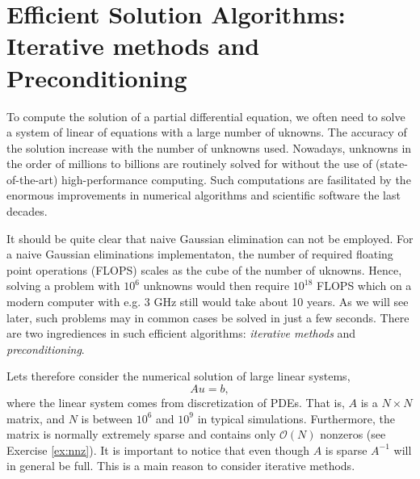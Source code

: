 \chapter{Efficient Solution Algorithms: Iterative methods and Preconditioning}

To compute the solution of a partial differential equation, we often 
need to solve a system of linear of equations with a large number of
uknowns. The accuracy of the solution increase with 
the number of unknowns used. Nowadays,  unknowns in the order
of millions to billions are routinely solved for  without the use of (state-of-the-art) 
high-performance computing. Such computations
are fasilitated by the enormous improvements in numerical algorithms and
scientific software the last decades.        

It should be quite clear that naive Gaussian elimination can not be employed. 
For a  naive Gaussian eliminations implementaton,   
the number of required floating point operations (FLOPS) scales as the cube
of the number of uknowns. Hence, solving a problem with $10^6$ unknowns
would then require $10^{18}$ FLOPS which on a modern computer
with e.g. 3 GHz still would take about 10 years. As we will see later, 
such problems may in common cases be solved in just a few seconds.  
There are two ingrediences in such efficient algorithms: 
{\it iterative methods} and {\it preconditioning}. 

Lets therefore consider the numerical solution of large linear systems,
\[
A u =  b,
\]
where the linear system comes from discretization of PDEs. That is,  
$A$ is a $N\times N$ matrix, and $N$ is between $10^6$ and $10^9$ 
in typical simulations. Furthermore, the matrix is normally extremely sparse and contains only $\mathcal{O}(N)$ 
nonzeros (see Exercise \ref{ex:nnz}). It is important to notice that 
even though $A$ is sparse $A^{-1}$ will in general be full. 
This is a main reason to consider iterative methods. 

